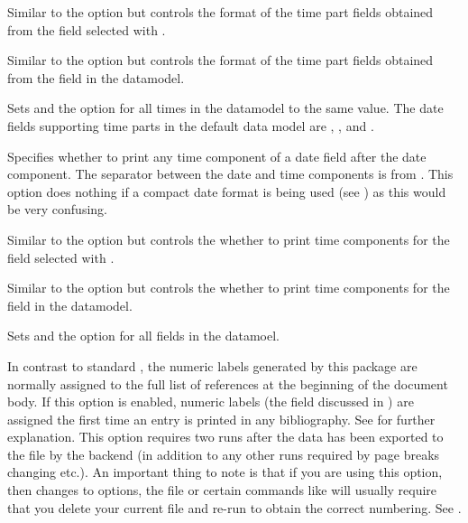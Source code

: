 \documentclass{ltxdockit}[2011/03/25]
\begin{document}
\begin{optionlist}

Similar to the  option but controls the format of the time part fields obtained from the field selected with .


Similar to the  option but controls the format of the time part fields obtained from the  field in the datamodel.


Sets  and the  option for all times in the datamodel to the same value. The date fields supporting time parts in the default data model are , ,  and .


Specifies whether to print any time component of a date field after the date component. The separator between the date and time components is  from . This option does nothing if a compact date format is being used (see ) as this would be very confusing.


Similar to the  option but controls the whether to print time components for the field selected with .


Similar to the  option but controls the whether to print time components for the  field in the datamodel.


Sets  and the  option for all  fields in the datamoel.


In contrast to standard \latex, the numeric labels generated by this package are normally assigned to the full list of references at the beginning of the document body. If this option is enabled, numeric labels (\ie the  field discussed in ) are assigned the first time an entry is printed in any bibliography. See  for further explanation.  This option requires two \latex runs after the data has been exported to the  file by the backend (in addition to any other runs required by page breaks changing etc.). An important thing to note is that if you are using this option, then changes to options, the  file or certain commands like  will usually require that you delete your current  file and re-run \latex to obtain the correct numbering. See .


\end{optionlist}
\end{document}
